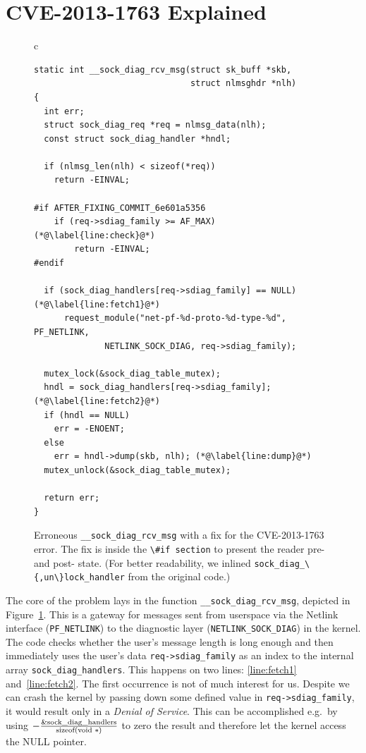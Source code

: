 \documentclass[10pt]{llncs}
\newcommand{\code}[2][]{\lstinline[columns=fullflexible, #1]$#2$}
\begin{document}
\section{CVE-2013-1763 Explained} \label{sec:cve}
\begin{figure}[htb]
  \begin{center}
    \begin{tabular}{c}
\begin{lstlisting}
static int __sock_diag_rcv_msg(struct sk_buff *skb,
                               struct nlmsghdr *nlh)
{
  int err;
  struct sock_diag_req *req = nlmsg_data(nlh);
  const struct sock_diag_handler *hndl;

  if (nlmsg_len(nlh) < sizeof(*req))
    return -EINVAL;

#if AFTER_FIXING_COMMIT_6e601a5356
	if (req->sdiag_family >= AF_MAX) (*@\label{line:check}@*)
		return -EINVAL;
#endif

  if (sock_diag_handlers[req->sdiag_family] == NULL) (*@\label{line:fetch1}@*)
	  request_module("net-pf-%d-proto-%d-type-%d", PF_NETLINK,
			  NETLINK_SOCK_DIAG, req->sdiag_family);

  mutex_lock(&sock_diag_table_mutex);
  hndl = sock_diag_handlers[req->sdiag_family]; (*@\label{line:fetch2}@*)
  if (hndl == NULL)
    err = -ENOENT;
  else
    err = hndl->dump(skb, nlh); (*@\label{line:dump}@*)
  mutex_unlock(&sock_diag_table_mutex);

  return err;
}
\end{lstlisting}
    \end{tabular}
  \end{center}
  \caption{Erroneous \code{__sock_diag_rcv_msg} with a fix for the
  CVE-2013-1763 error.  The fix is inside the \code{\#if section} to present
  the reader pre- and post- state.  (For better readability, we inlined
  \code{sock_diag_\{,un\}lock_handler} from the original code.)}
  \label{fig:hole}
\end{figure}

The core of the problem lays in the function \code{__sock_diag_rcv_msg},
depicted in Figure~\ref{fig:hole}.  This is a gateway for messages sent from
userspace via the Netlink~\cite{netlink} interface (\code{PF_NETLINK}) to the
diagnostic layer (\code{NETLINK_SOCK_DIAG}) in the kernel. The code checks
whether the user's message length is long enough and then immediately uses the
user's data \code{req->sdiag_family} as an index to the internal array
\code{sock_diag_handlers}. This happens on two lines: \ref{line:fetch1}
and~\ref{line:fetch2}.  The first occurrence is not of much interest for us.
Despite we can crash the kernel by passing down some defined value in
\code{req->sdiag_family}, it would result only in a \emph{Denial of Service}.
This can be accomplished e.g.\ by using
$-\frac{\text{\code{&sock_diag_handlers}}}{\text{\code{sizeof(void *)}}}$ to
zero the result and therefore let the kernel access the NULL pointer.
\end{document}
